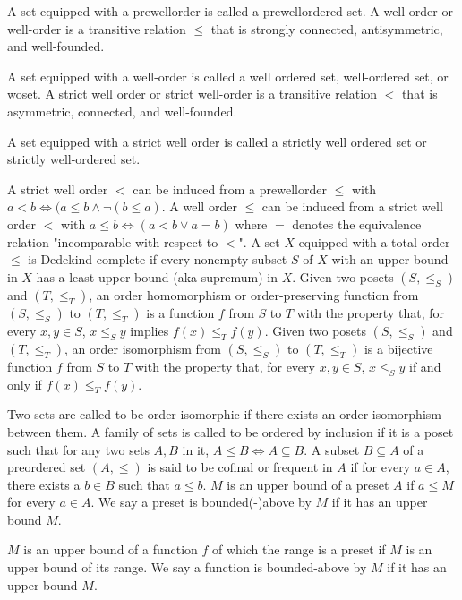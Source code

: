 \documentclass[a4paper,12pt]{article}
\begin{document}
A set equipped with a prewellorder is called a prewellordered set.
A well order or well-order is a transitive relation $\leq$ that is strongly connected, antisymmetric, and well-founded.

A set equipped with a well-order is called a well ordered set, well-ordered set, or woset.
A strict well order or strict well-order is a transitive relation $<$ that is asymmetric, connected, and well-founded.

A set equipped with a strict well order is called a strictly well ordered set or strictly well-ordered set.

A strict well order $<$ can be induced from a prewellorder $\leq$ with $a<b\iff(a\leq b\land \neg(b\leq a)$. A well order $\leq$ can be induced from a strict well order $<$ with $a\leq b\iff(a<b\lor a=b)$ where $=$ denotes the equivalence relation "incomparable with respect to $<$".
A set $X$ equipped with a total order $\leq$ is Dedekind-complete if every nonempty subset $S$ of $X$ with an upper bound in $X$ has a least upper bound (aka supremum) in $X$.
Given two posets $(S,\leq _{S})$ and $(T,\leq _{T})$, an order homomorphism or order-preserving function from $(S,\leq _{S})$ to $(T,\leq _{T})$ is a function $f$ from $S$ to $T$ with the property that, for every $x,y\in S$, $x \leq_S y$ implies $f(x)\leq _{T}f(y)$.
Given two posets $(S,\leq _{S})$ and $(T,\leq _{T})$, an order isomorphism from $(S,\leq _{S})$ to $(T,\leq _{T})$ is a bijective function $f$ from $S$ to $T$ with the property that, for every $x,y\in S$, $x \leq_S y$ if and only if $f(x)\leq _{T}f(y)$.

Two sets are called to be order-isomorphic if there exists an order isomorphism between them.
A family of sets is called to be ordered by inclusion if it is a poset such that for any two sets $A,B$ in it, $A\leq B\iff A\subseteq B$.
A subset $B\subseteq A$ of a preordered set $(A,\leq )$ is said to be cofinal or frequent in $A$ if for every $a\in A$, there exists a $b\in B$ such that $a\leq b$.
$M$ is an upper bound of a preset $A$ if $a\leq M$ for every $a\in A$. We say a preset is bounded(-)above by $M$ if it has an upper bound $M$.

$M$ is an upper bound of a function $f$ of which the range is a preset if $M$ is an upper bound of its range. We say a function is bounded-above by $M$ if it has an upper bound $M$.
\end{document}
